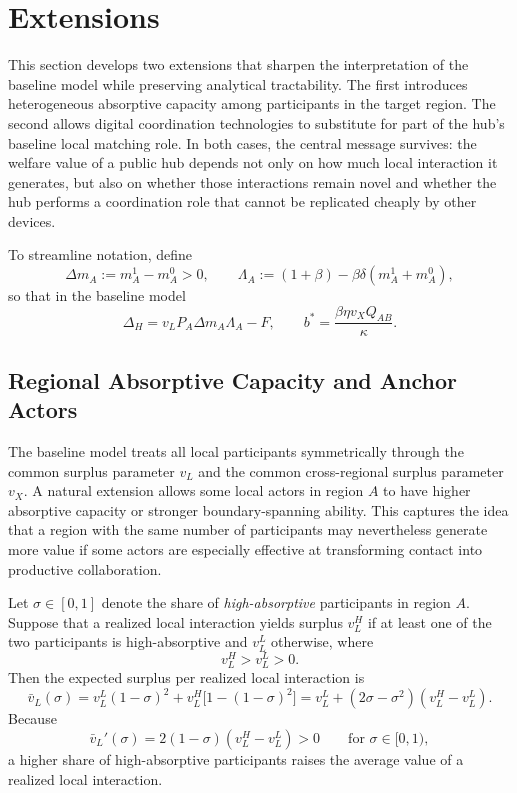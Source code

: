 \section{Extensions}
\label{sec:extensions}

This section develops two extensions that sharpen the interpretation of the baseline model while preserving analytical tractability. The first introduces heterogeneous absorptive capacity among participants in the target region. The second allows digital coordination technologies to substitute for part of the hub's baseline local matching role. In both cases, the central message survives: the welfare value of a public hub depends not only on how much local interaction it generates, but also on whether those interactions remain novel and whether the hub performs a coordination role that cannot be replicated cheaply by other devices.

To streamline notation, define
\[
\Delta m_A:=m_A^1-m_A^0>0,
\qquad
\Lambda_A:=(1+\beta)-\beta\delta(m_A^1+m_A^0),
\]
so that in the baseline model
\[
\Delta_H=v_LP_A\Delta m_A\Lambda_A-F,
\qquad
b^*=\frac{\beta\eta v_XQ_{AB}}{\kappa}.
\]

\subsection{Regional Absorptive Capacity and Anchor Actors}

The baseline model treats all local participants symmetrically through the common surplus parameter $v_L$ and the common cross-regional surplus parameter $v_X$. A natural extension allows some local actors in region $A$ to have higher absorptive capacity or stronger boundary-spanning ability. This captures the idea that a region with the same number of participants may nevertheless generate more value if some actors are especially effective at transforming contact into productive collaboration.

Let $\sigma\in[0,1]$ denote the share of \emph{high-absorptive} participants in region $A$. Suppose that a realized local interaction yields surplus $v_L^H$ if at least one of the two participants is high-absorptive and $v_L^L$ otherwise, where
\[
v_L^H>v_L^L>0.
\]
Then the expected surplus per realized local interaction is
\begin{equation}
\bar v_L(\sigma)
=
v_L^L(1-\sigma)^2
+
v_L^H\bigl[1-(1-\sigma)^2\bigr]
=
v_L^L+(2\sigma-\sigma^2)(v_L^H-v_L^L).
\label{eq:vbarL_sigma}
\end{equation}
Because
\begin{equation}
\bar v_L'(\sigma)=2(1-\sigma)(v_L^H-v_L^L)>0
\qquad
\text{for } \sigma\in[0,1),
\label{eq:vbarL_prime}
\end{equation}
a higher share of high-absorptive participants raises the average value of a realized local interaction.

